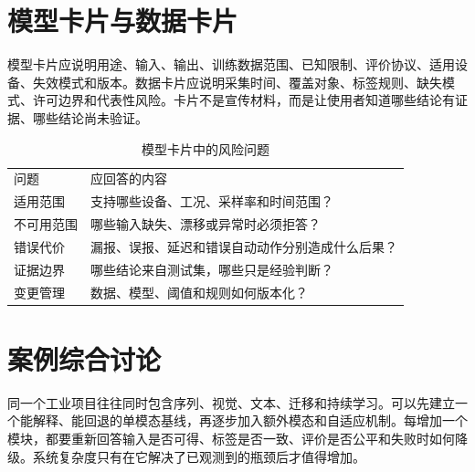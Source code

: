 \section{模型卡片与数据卡片}
模型卡片应说明用途、输入、输出、训练数据范围、已知限制、评价协议、适用设备、失效模式和版本。数据卡片应说明采集时间、覆盖对象、标签规则、缺失模式、许可边界和代表性风险。卡片不是宣传材料，而是让使用者知道哪些结论有证据、哪些结论尚未验证。

\begin{table}[htbp]
\centering
\caption{模型卡片中的风险问题}
\begin{tabular}{p{}p{}}
\toprule
问题 & 应回答的内容\\
适用范围 & 支持哪些设备、工况、采样率和时间范围？\\
不可用范围 & 哪些输入缺失、漂移或异常时必须拒答？\\
错误代价 & 漏报、误报、延迟和错误自动动作分别造成什么后果？\\
证据边界 & 哪些结论来自测试集，哪些只是经验判断？\\
变更管理 & 数据、模型、阈值和规则如何版本化？\\
\bottomrule
\end{tabular}
\end{table}

\section{案例综合讨论}
同一个工业项目往往同时包含序列、视觉、文本、迁移和持续学习。可以先建立一个能解释、能回退的单模态基线，再逐步加入额外模态和自适应机制。每增加一个模块，都要重新回答输入是否可得、标签是否一致、评价是否公平和失败时如何降级。系统复杂度只有在它解决了已观测到的瓶颈后才值得增加。